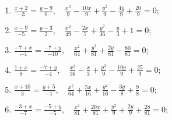 \begin{enumerate}
			\item \( \displaystyle \frac{x+2}{-3} = \frac{y-9}{0}, \quad \frac{x^2}{9} - \frac{10 x}{9} + \frac{y^2}{9} - \frac{4 y}{9} + \frac{20}{9} = 0 \);
			\item \( \displaystyle \frac{x-9}{-5} = \frac{y-3}{2}, \quad \frac{x^2}{49} - \frac{2 x}{7} + \frac{y^2}{36} - \frac{y}{3} + 1 = 0 \);
			\item \( \displaystyle \frac{-7+x}{-4} = \frac{-7+y}{-10}, \quad \frac{x^2}{64} + \frac{y^2}{81} + \frac{2 y}{81} - \frac{80}{81} = 0 \);
			\item \( \displaystyle \frac{1+x}{8} = \frac{-7+y}{-4}, \quad \frac{x^2}{36} - \frac{x}{3} + \frac{y^2}{9} - \frac{10 y}{9} + \frac{25}{9} = 0 \);
			\item \( \displaystyle \frac{x+10}{3} = \frac{y+5}{-1}, \quad \frac{x^2}{64} + \frac{5 x}{16} + \frac{y^2}{16} - \frac{3 y}{8} + \frac{9}{8} = 0 \);
			\item \( \displaystyle \frac{-3+x}{-7} = \frac{-5+y}{-5}, \quad \frac{x^2}{81} + \frac{20 x}{81} + \frac{y^2}{9} + \frac{2 y}{9} + \frac{28}{81} = 0 \);

		\setcounter{tasks}{\value{enumi}}
	\end{enumerate}

	\vspace{10pt}

